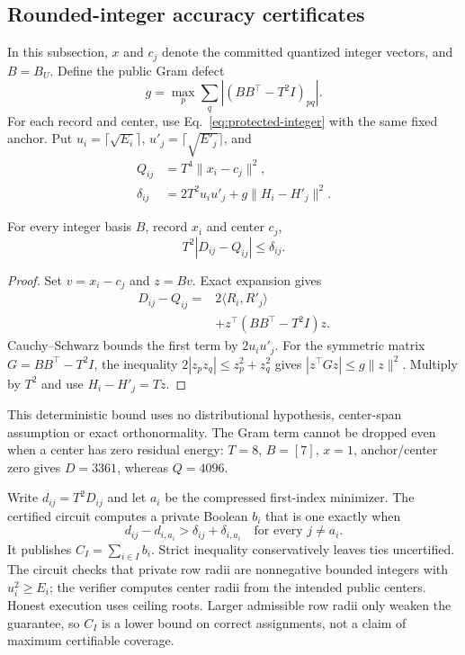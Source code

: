 \subsection{Rounded-integer accuracy certificates}\label{sec:integer-certificates}
In this subsection, $x$ and $c_j$ denote the committed quantized integer vectors, and $B=B_U$. Define the public Gram defect
\begin{equation}
g=\max_p\sum_q |(BB^\top-T^2I)_{pq}|.
\end{equation}
For each record and center, use Eq.~\eqref{eq:protected-integer} with the same fixed anchor. Put $u_i=\lceil\sqrt{E_i}\rceil$, $u'_j=\lceil\sqrt{E'_j}\rceil$, and
\begin{align}
Q_{ij}&=T^4\|x_i-c_j\|^2,\nonumber\\
\delta_{ij}&=2T^2u_i u'_j+g\|H_i-H'_j\|^2.\label{eq:integer-delta}
\end{align}
\begin{proposition}\label{prop:integer-envelope}
For every integer basis $B$, record $x_i$ and center $c_j$,
\begin{equation}\label{eq:integer-envelope}
T^2|D_{ij}-Q_{ij}|\le\delta_{ij}.
\end{equation}
\end{proposition}
\begin{proof}
Set $v=x_i-c_j$ and $z=Bv$. Exact expansion gives
\begin{align*}
D_{ij}-Q_{ij}={}&2\langle R_i,R'_j\rangle\\
&+z^\top(BB^\top-T^2I)z.
\end{align*}
Cauchy--Schwarz bounds the first term by $2u_i u'_j$. For the symmetric matrix $G=BB^\top-T^2I$, the inequality $2|z_pz_q|\le z_p^2+z_q^2$ gives $|z^\top Gz|\le g\|z\|^2$. Multiply by $T^2$ and use $H_i-H'_j=Tz$.
\end{proof}
This deterministic bound uses no distributional hypothesis, center-span assumption or exact orthonormality. The Gram term cannot be dropped even when a center has zero residual energy: $T=8$, $B=[7]$, $x=1$, anchor/center zero gives $D=3361$, whereas $Q=4096$.

Write $d_{ij}=T^2D_{ij}$ and let $a_i$ be the compressed first-index minimizer. The certified circuit computes a private Boolean $b_i$ that is one exactly when
\begin{equation}\label{eq:integer-stability}
d_{ij}-d_{i,a_i}>\delta_{ij}+\delta_{i,a_i}
\quad\text{for every }j\ne a_i.
\end{equation}
It publishes $C_I=\sum_{i\in I}b_i$. Strict inequality conservatively leaves ties uncertified. The circuit checks that private row radii are nonnegative bounded integers with $u_i^2\ge E_i$; the verifier computes center radii from the intended public centers. Honest execution uses ceiling roots. Larger admissible row radii only weaken the guarantee, so $C_I$ is a lower bound on correct assignments, not a claim of maximum certifiable coverage.

